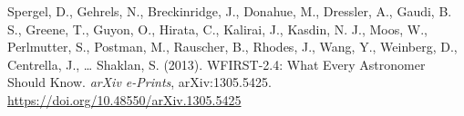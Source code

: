 \documentclass[10pt,a4paper,onecolumn]{article}
\newlength{\cslhangindent}
\newenvironment{CSLReferences}[2] %
 {\begin{list}{}{%
  \setlength{\itemindent}{0pt}
  \setlength{\leftmargin}{0pt}
  \setlength{\parsep}{0pt}
  \ifodd #1
   \setlength{\leftmargin}{\cslhangindent}
   \setlength{\itemindent}{-1\cslhangindent}
  \fi
  \setlength{\itemsep}{#2\baselineskip}}}
 {\end{list}}
\begin{document}
\begin{CSLReferences}{1}{0.5}
Spergel, D., Gehrels, N., Breckinridge, J., Donahue, M., Dressler, A.,
Gaudi, B. S., Greene, T., Guyon, O., Hirata, C., Kalirai, J., Kasdin, N.
J., Moos, W., Perlmutter, S., Postman, M., Rauscher, B., Rhodes, J.,
Wang, Y., Weinberg, D., Centrella, J., \ldots{} Shaklan, S. (2013).
{WFIRST-2.4: What Every Astronomer Should Know}. \emph{arXiv e-Prints},
arXiv:1305.5425. \url{https://doi.org/10.48550/arXiv.1305.5425}

\end{CSLReferences}
\end{document}
